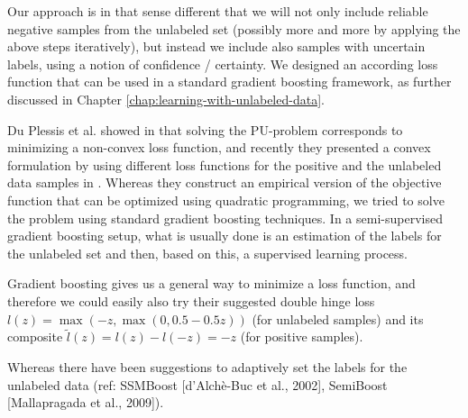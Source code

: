 Our approach is in that sense different that we will not only include reliable negative samples from the unlabeled set (possibly more and more by applying the above steps iteratively), but instead we include also samples with uncertain labels, using a notion of confidence / certainty. 
We designed an according loss function that can be used in a standard gradient boosting framework, as further discussed in Chapter \ref{chap:learning-with-unlabeled-data}.

Du Plessis et al. showed in \cite{plessis2014PUanalysis} that solving the PU-problem corresponds to minimizing a non-convex loss function, and recently they presented a convex formulation by using different loss functions for the positive and the unlabeled data samples in \cite{plessis2015convex}. Whereas they construct an empirical version of the objective function that can be optimized using quadratic programming, we tried to solve the problem using standard gradient boosting techniques. 
In a semi-supervised gradient boosting setup, what is usually done is an estimation of the labels for the unlabeled set and then, based on this, a supervised learning process. 

Gradient boosting gives us a general way to minimize a loss function, and therefore we could easily also try their suggested double hinge loss $l(z) = \max(-z,\max(0,0.5 - 0.5 z))$ (for unlabeled samples) and its composite $\tilde l(z) = l(z) - l(-z) = -z$ (for positive samples). 


Whereas there have been suggestions to adaptively set the labels for the unlabeled data (ref: SSMBoost [d'Alch\`e-Buc et al., 2002], SemiBoost [Mallapragada et al., 2009]).
